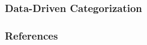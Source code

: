 \documentclass[xcolor=dvipsnames,notes]{beamer}
\begin{document}




% 

\begin{frame}
\frametitle{Data-Driven Categorization}
\end{frame}

\begin{frame}[allowframebreaks]
    \frametitle{References}
    
    
\end{frame}
\end{document}
